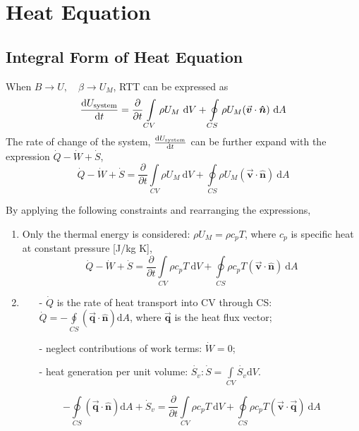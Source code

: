 \documentclass[12pt, a4paper]{article}
\numberwithin{equation}{subsection}
\begin{document}
\newpage
\section{Heat Equation}
\subsection{Integral Form of Heat Equation}
When $B \to U, \quad \beta \to U_{M}$, RTT can be expressed as
\[
    \frac{\mathrm{d}U_{\rm system}}{\mathrm{d}t} = \frac{\partial}{\partial t} \int\limits_{CV} \rho U_{M} \ \mathrm{d}V +  \oint\limits_{CS} \rho U_{M} (\vec{\bm{v}} \cdot \bm{\hat{n}}) \ \mathrm{d}A
\]
The rate of change of the system, $\frac{\mathrm{d}U_{\rm system}}{\mathrm{d}t}$ can be further expand with the expression $\dot{Q}-\dot{W}+\dot{S}$,
\[
  \dot{Q}-\dot{W}+\dot{S} = \frac{\partial}{\partial t} \int\limits_{CV} \rho U_{M} \ \mathrm{d}V +  \oint\limits_{CS} \rho U_{M} (\vec{\bm{v}} \cdot \bm{\hat{n}}) \ \mathrm{d}A
\]

By applying the following constraints and rearranging the expressions,
\begin{enumerate}
    \item Only the thermal energy is considered: $\rho U_{M} = \rho c_{p} T$, where $c_{p}$ is specific heat at constant pressure {\color{gray}[J/kg K]},
    \[
        \dot{Q}-\dot{W}+\dot{S} = \frac{\partial}{\partial t} \int\limits_{CV} \rho c_p T \ \mathrm{d}V +  \oint\limits_{CS} \rho c_p T (\vec{\bm{v}} \cdot \bm{\hat{n}}) \ \mathrm{d}A
    \]
    
    \item \begin{itemize}
        \item[-] $\dot{Q}$ is the rate of heat transport into CV through CS: $\displaystyle \dot{Q} = -\oint\limits_{CS}(\vec{\bm{q}} \cdot \bm{\hat{n}}) \mathrm{d}A$, where $\vec{\bm{q}}$ is the heat flux vector;
        \item[-] neglect contributions of work terms: $\dot{W}=0$;
        \item[-] heat generation per unit volume: $\displaystyle \dot{S_{v}}: \dot{S} = \int\limits_{CV}\dot{S_{v}} \mathrm{d}V$.
    \end{itemize}
    \[
        -\oint\limits_{CS}(\vec{\bm{q}} \cdot \bm{\hat{n}}) \mathrm{d}A+\dot{S}_v = \frac{\partial}{\partial t} \int\limits_{CV} \rho c_p T \ \mathrm{d}V +  \oint\limits_{CS} \rho c_p T (\vec{\bm{v}} \cdot \vec{\bm{q}}) \ \mathrm{d}A
    \]
\end{enumerate}
\end{document}
